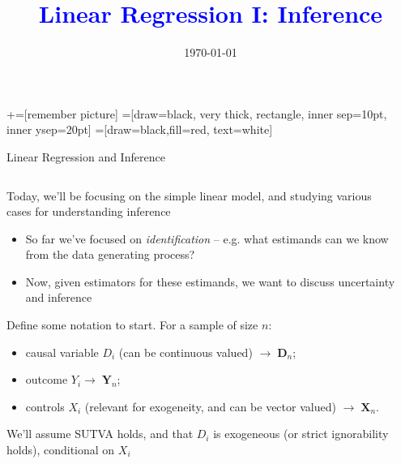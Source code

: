 \documentclass[notes,11pt, aspectratio=169]{beamer}
\title[]{\textcolor{blue}{Linear Regression I: Inference}}
\author[PGP]{}
\institute[FRBNY]{\small{Paul Goldsmith-Pinkham}}
\date{\today}
\newenvironment{wideitemize}{\itemize\addtolength{\itemsep}{10pt}}{\enditemize}
\begin{document}
\newcommand\marktopleft[1]{%
    \tikz[overlay,remember picture] 
        \node (marker-#1-a) at (-.3em,.3em) {};%
}
\newcommand\markbottomright[2]{%
    \tikz[overlay,remember picture] 
        \node (marker-#1-b) at (0em,0em) {};%
}
+=[remember picture] 
 =[draw=black, very thick, rectangle, inner sep=10pt, inner ysep=20pt]
 =[draw=black,fill=red, text=white]

\begin{frame}
\maketitle

\end{frame}

\begin{frame}{Linear Regression and Inference}
\begin{columns}[T] %
\begin{column}{.8\textwidth}
  \begin{wideitemize}
  \item Today, we'll be focusing on the simple linear model, and studying various cases for understanding inference
    \begin{itemize}
    \item So far we've focused on \emph{identification} -- e.g. what estimands can we know from the data generating process?
    \item Now, given estimators for these estimands, we want to discuss uncertainty and inference
    \end{itemize}
  \item Define some notation to start. For a sample of size $n$:
    \begin{itemize}
    \item causal variable $D_{i}$ (can be continuous valued) $\rightarrow  \; \mathbf{D}_{n}$;
    \item outcome $Y_{i} \rightarrow  \; \mathbf{Y}_{n}$;
    \item controls $X_{i}$ (relevant for exogeneity, and can be vector valued)  $\rightarrow  \; \mathbf{X}_{n}$.
    \end{itemize}
  \item We'll assume SUTVA holds, and that $D_{i}$ is exogeneous (or strict ignorability holds), conditional on $X_{i}$
  \end{wideitemize}
  \end{column}%
  \hfill%
  \begin{column}{.5\textwidth}
  \end{column}
\end{columns}
\end{frame}
\end{document}
